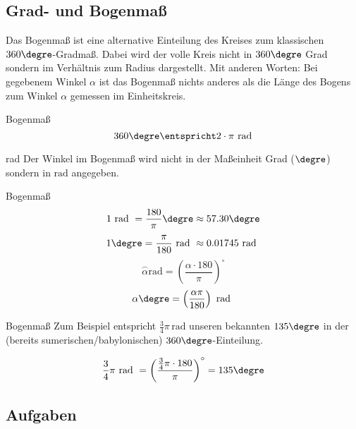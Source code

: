 
\subsection{Grad- und Bogenmaß}


Das Bogenmaß ist eine alternative Einteilung des Kreises zum
klassischen $360\degre$-Gradmaß. Dabei wird der volle Kreis nicht in
$360\degre$ Grad sondern im Verhältnis zum Radius dargestellt. Mit
anderen Worten: Bei gegebenem Winkel $\alpha$ ist das Bogenmaß nichts
anderes als die Länge des Bogens zum Winkel $\alpha$ gemessen im Einheitskreis.


\begin{definition}{Bogenmaß}{}
$$360\degre \entspricht 2\cdot\pi \text{\,\,rad}$$
\end{definition}

\begin{bemerkung}{rad}{}
Der Winkel im Bogenmaß wird nicht in der Maßeinheit Grad (${}\degre$)
sondern in $\text{rad}$ angegeben.
\end{bemerkung}

\begin{gesetz}{Bogenmaß}{}
$$1 \text{ rad } = \frac{180}{\pi}\degre \approx 57.30\degre$$
$$1\degre = \frac{\pi}{180} \text{ rad } \approx 0.01745 \text{ rad }$$
$$\stackrel{\frown}{\alpha} \text{rad} = \left(\frac{\alpha\cdot{}180}{\pi}\right)^\circ$$
$$\alpha\degre = \left(\frac{\alpha\pi}{180}\right) \text{ rad }$$  
\end{gesetz}

\begin{beispiel}{Bogenmaß}{}
 Zum Beispiel entspricht
$\frac{3}{4}\pi\,\text{rad}$ unseren bekannten $135\degre$ in der
(bereits sumerischen/babylonischen) $360\degre$-Einteilung.

 $$\frac34\pi \text{ rad } = \left(\frac{\frac34\pi\cdot{}180}{\pi}\right)^\circ = 135\degre$$
\end{beispiel}
\newpage



\subsection*{Aufgaben}




\newpage
